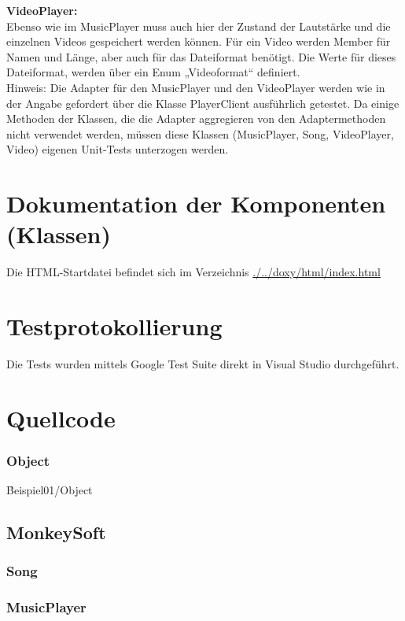 \textbf{VideoPlayer:}\\
Ebenso wie im MusicPlayer muss auch hier der Zustand der Lautstärke und die einzelnen Videos gespeichert werden können. Für ein Video werden Member für Namen und Länge, aber auch für das Dateiformat benötigt. Die Werte für dieses Dateiformat, werden über ein Enum „Videoformat“ definiert.\\

Hinweis: Die Adapter für den MusicPlayer und den VideoPlayer werden wie in der Angabe gefordert über die Klasse PlayerClient ausführlich getestet. Da einige Methoden der Klassen, die die Adapter aggregieren von den Adaptermethoden nicht verwendet werden, müssen diese Klassen (MusicPlayer, Song, VideoPlayer, Video) eigenen Unit-Tests unterzogen werden.\\

\section{Dokumentation der Komponenten (Klassen)}

Die HTML-Startdatei befindet sich im Verzeichnis \href{run:./../doxy/html/index.html}{./../doxy/html/index.html}

\section{Testprotokollierung}

Die Tests wurden mittels Google Test Suite direkt in Visual Studio durchgeführt.

\section{Quellcode}
\subsubsection{Object}
\h{Beispiel01/Object}

\subsection{MonkeySoft}
\subsubsection{Song}
\subsubsection{MusicPlayer}



